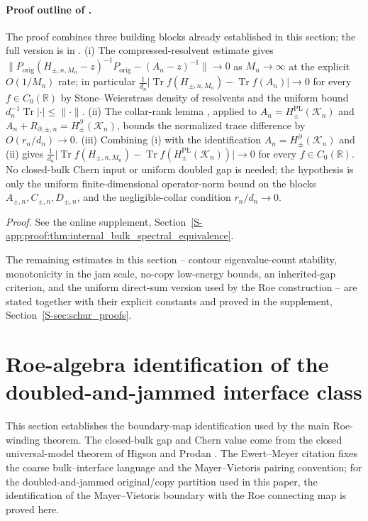 \documentclass[11pt]{article}
\numberwithin{equation}{section}
\theoremstyle{definition}
\theoremstyle{remark}
\newcommand{\proofsuppref}[1]{%
  \par\noindent\emph{Proof.} See the online supplement, Section~\ref{S-#1}.\par\medskip
}
\newcommand{\K}{\mathcal{K}}
\newcommand{\bd}{\partial}
\begin{document}
\paragraph{Proof outline of .}
The proof combines three building blocks already established in this section; the full version
is in .
(i) The compressed-resolvent estimate  gives
\(\|P_{\mathrm{orig}}(H_{\pm,n,M_n}-z)^{-1}P_{\mathrm{orig}}-(A_n-z)^{-1}\|\to 0\) as
\(M_n\to\infty\) at the explicit \(O(1/M_n)\) rate; in particular
\(\tfrac{1}{d_n}\bigl|\operatorname{Tr} f(H_{\pm,n,M_n})-\operatorname{Tr} f(A_n)\bigr|\to 0\) for every
\(f\in C_0(\mathbb R)\) by Stone--Weierstrass density of resolvents and the uniform bound
\(d_n^{-1}\operatorname{Tr}|\cdot|\le \|\cdot\|\).
(ii) The collar-rank lemma , applied to
\(A_n=H^{\mathrm{PL}}_\pm(\K_n)\) and \(A_n+R_{\partial,\pm,n}=H^{\bd}_{\pm}(\K_n)\), bounds
the normalized trace difference by \(O(r_n/d_n)\to 0\).
(iii) Combining (i) with the identification \(A_n=H^{\bd}_\pm(\K_n)\) and (ii) gives
\(\tfrac{1}{d_n}\bigl|\operatorname{Tr} f(H_{\pm,n,M_n})-\operatorname{Tr} f(H^{\mathrm{PL}}_\pm(\K_n))\bigr|\to 0\) for
every \(f\in C_0(\mathbb R)\). No closed-bulk Chern input or uniform doubled gap is needed; the
hypothesis is only the uniform finite-dimensional operator-norm bound on the blocks
\(A_{\pm,n},C_{\pm,n},D_{\pm,n}\), and the negligible-collar condition \(r_n/d_n\to 0\).

\proofsuppref{app:proof:thm:internal_bulk_spectral_equivalence}

The remaining estimates in this section -- contour eigenvalue-count stability, monotonicity in the
jam scale, no-copy low-energy bounds, an inherited-gap criterion, and the uniform direct-sum
version used by the Roe construction -- are stated together with their explicit constants and
proved in the supplement, Section~\ref{S-sec:schur_proofs}.

\section{Roe-algebra identification of the doubled-and-jammed interface class}\label{sec:pathb_internalization}

This section establishes the boundary-map identification used by the main Roe-winding theorem.
The closed-bulk gap and Chern value come from the closed universal-model theorem of Higson and
Prodan \cite{HigsonProdanUniversalPRL,HigsonProdanUniversalArxiv}. The Ewert--Meyer citation
\cite{EwertMeyer2019} fixes the coarse bulk--interface language and the Mayer--Vietoris pairing
convention; for the doubled-and-jammed original/copy partition used in this paper, the
identification of the Mayer--Vietoris boundary with the Roe connecting map is proved here.
\end{document}

